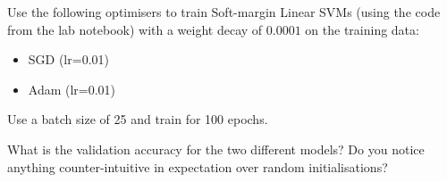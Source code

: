 \documentclass[a4paper]{article}
\begin{document}
\begin{tcolorbox}[title=2.1 Iris SVM (2 marks)]
Use the following optimisers to train Soft-margin Linear SVMs (using the code from the lab notebook) with a weight decay of $0.0001$ on the training data: 
\begin{itemize}
	\item SGD (lr=0.01)
	\item Adam (lr=0.01)
\end{itemize}
Use a batch size of 25 and train for 100 epochs.

What is the validation accuracy for the two different models? Do you notice anything counter-intuitive in expectation over random initialisations?
\end{tcolorbox}
\end{document}
